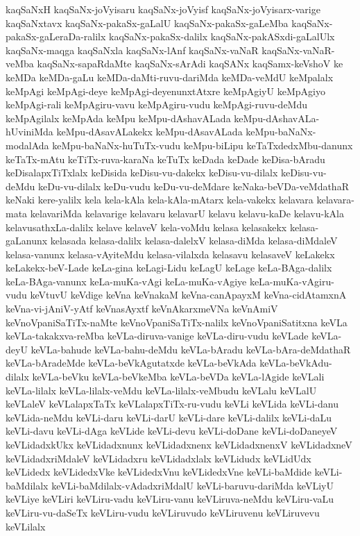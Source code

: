 {kaqSaNxH
kaqSaNx-joVyisaru
kaqSaNx-joVyisf
kaqSaNx-joVyisarx-varige
kaqSaNxtavx
kaqSaNx-pakaSx-gaLalU
kaqSaNx-pakaSx-gaLeMba
kaqSaNx-pakaSx-gaLeraDa-ralilx
kaqSaNx-pakaSx-dalilx
kaqSaNx-pakASxdi-gaLalUlx
kaqSaNx-maqga
kaqSaNxla
kaqSaNx-lAnf
kaqSaNx-vaNaR
kaqSaNx-vaNaR-veMba
kaqSaNx-sapaRdaMte
kaqSaNx-sArAdi
kaqSANx
kaqSamx-keVshoV
ke
keMDa
keMDa-gaLu
keMDa-daMti-ruvu-dariMda
keMDa-veMdU
keMpalalx
keMpAgi
keMpAgi-deye
keMpAgi-deyenunxtAtxre
keMpAgiyU
keMpAgiyo
keMpAgi-rali
keMpAgiru-vavu
keMpAgiru-vudu
keMpAgi-ruvu-deMdu
keMpAgilalx
keMpAda
keMpu
keMpu-dAshavALada
keMpu-dAshavALa-hUviniMda
keMpu-dAsavALakekx
keMpu-dAsavALada
keMpu-baNaNx-modalAda
keMpu-baNaNx-huTuTx-vudu
keMpu-biLipu
keTaTxdedxMbu-danunx
keTaTx-mAtu
keTiTx-ruva-karaNa
keTuTx
keDada
keDade
keDisa-bAradu
keDisalapxTiTxlalx
keDisida
keDisu-vu-dakekx
keDisu-vu-dilalx
keDisu-vu-deMdu
keDu-vu-dilalx
keDu-vudu
keDu-vu-deMdare
keNaka-beVDa-veMdathaR
keNaki
kere-yalilx
kela
kela-kAla
kela-kAla-mAtarx
kela-vakekx
kelavara
kelavara-mata
kelavariMda
kelavarige
kelavaru
kelavarU
kelavu
kelavu-kaDe
kelavu-kAla
kelavusathxLa-dalilx
kelave
kelaveV
kela-voMdu
kelasa
kelasakekx
kelasa-gaLanunx
kelasada
kelasa-dalilx
kelasa-dalelxV
kelasa-diMda
kelasa-diMdaleV
kelasa-vanunx
kelasa-vAyiteMdu
kelasa-vilalxda
kelasavu
kelasaveV
keLakekx
keLakekx-beV-Lade
keLa-gina
keLagi-Lidu
keLagU
keLage
keLa-BAga-dalilx
keLa-BAga-vanunx
keLa-muKa-vAgi
keLa-muKa-vAgiye
keLa-muKa-vAgiru-vudu
keVtuvU
keVdige
keVna
keVnakaM
keVna-canApayxM
keVna-cidAtamxnA
keVna-vi-jAniV-yAtf
keVnasAyxtf
keVnAkarxmeVNa
keVnAmiV
keVnoVpaniSaTiTx-naMte
keVnoVpaniSaTiTx-nalilx
keVnoVpaniSatitxna
keVLa
keVLa-takakxva-reMba
keVLa-diruva-vanige
keVLa-diru-vudu
keVLade
keVLa-deyU
keVLa-bahude
keVLa-bahu-deMdu
keVLa-bAradu
keVLa-bAra-deMdathaR
keVLa-bAradeMde
keVLa-beVkAgutatxde
keVLa-beVkAda
keVLa-beVkAdu-dilalx
keVLa-beVku
keVLa-beVkeMba
keVLa-beVDa
keVLa-lAgide
keVLali
keVLa-lilalx
keVLa-lilalx-veMdu
keVLa-lilalx-veMbudu
keVLalu
keVLalU
keVLaleV
keVLalapxTaTx
keVLalapxTiTx-ru-vudu
keVLi
keVLida
keVLi-danu
keVLida-neMdu
keVLi-daru
keVLi-darU
keVLi-dare
keVLi-dalilx
keVLi-daLu
keVLi-davu
keVLi-dAga
keVLide
keVLi-devu
keVLi-doDane
keVLi-doDaneyeV
keVLidadxkUkx
keVLidadxnunx
keVLidadxnenx
keVLidadxnenxV
keVLidadxneV
keVLidadxriMdaleV
keVLidadxru
keVLidadxlalx
keVLidudx
keVLidUdx
keVLidedx
keVLidedxVke
keVLidedxVnu
keVLidedxVne
keVLi-baMdide
keVLi-baMdilalx
keVLi-baMdilalx-vAdadxriMdalU
keVLi-baruvu-dariMda
keVLiyU
keVLiye
keVLiri
keVLiru-vadu
keVLiru-vanu
keVLiruva-neMdu
keVLiru-vaLu
keVLiru-vu-daSeTx
keVLiru-vudu
keVLiruvudo
keVLiruvenu
keVLiruvevu
keVLilalx
}
